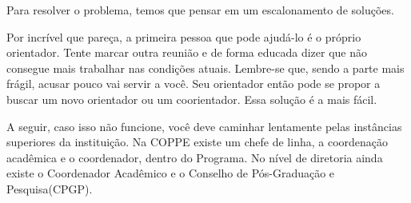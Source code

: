 Para resolver o problema, temos que pensar em um escalonamento de soluções. 

Por incrível que pareça, a primeira pessoa que pode ajudá-lo é o próprio orientador. Tente marcar outra reunião e de forma educada dizer que não consegue mais trabalhar nas condições atuais. Lembre-se que, sendo a parte mais frágil, acusar pouco vai servir a você. Seu orientador então pode se propor a buscar um novo orientador ou um coorientador. Essa solução é a mais fácil.

A seguir, caso isso não funcione, você deve caminhar lentamente pelas instâncias superiores da instituição. Na COPPE existe um chefe de linha, a coordenação acadêmica e o coordenador, dentro do Programa. No nível de diretoria ainda existe o Coordenador Acadêmico e o Conselho de Pós-Graduação e Pesquisa(CPGP).

